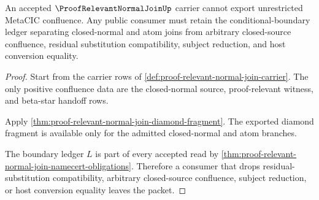 \begin{theorem}\label{thm:proof-relevant-normal-join-full-confluence-nonescape}
An accepted $\ProofRelevantNormalJoinUp$ carrier cannot export unrestricted MetaCIC confluence. Any public consumer must retain the conditional-boundary ledger separating closed-normal and atom joins from arbitrary closed-source confluence, residual substitution compatibility, subject reduction, and host conversion equality.
\end{theorem}
\begin{proof}
Start from the carrier rows of \autoref{def:proof-relevant-normal-join-carrier}. The only positive confluence data are the closed-normal source, proof-relevant witness, and beta-star handoff rows.

Apply \autoref{thm:proof-relevant-normal-join-diamond-fragment}. The exported diamond fragment is available only for the admitted closed-normal and atom branches.

The boundary ledger $L$ is part of every accepted read by \autoref{thm:proof-relevant-normal-join-namecert-obligations}. Therefore a consumer that drops residual-substitution compatibility, arbitrary closed-source confluence, subject reduction, or host conversion equality leaves the packet.
\end{proof}


